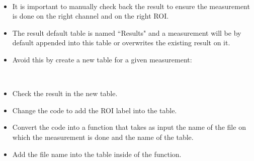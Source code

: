 \begin{frame}[fragile]
	\begin{example}~\par
		\begin{itemize}
			\item It is important to manually check back the result to ensure the measurement is done on the right channel and on the right ROI.
			\item The result default table is named ``Results" and a measurement will be by default appended into this table or overwrites the existing result on it.
			\item Avoid this by create a new table for a given measurement:\par
			
		\end{itemize}
	\end{example}
\end{frame}

\begin{frame}[fragile]
	\begin{example}~\par
		\begin{itemize}
			\item Check the result in the new table.
			\item Change the code to add the ROI label into the table.
			\item Convert the code into a function that takes as input the name of the file on which the measurement is done and the name of the table.
			\item Add the file name into the table inside of the function.
		\end{itemize}
	\end{example}
\end{frame}

